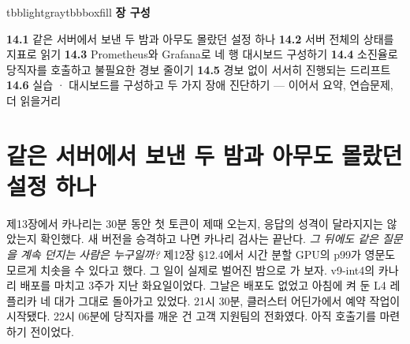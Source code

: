 \vspace{2.5pt}

\begin{calloutbox}{tbblightgray}{tbbboxfill}
{\normalsize\bfseries\color{tbbink}장 구성}\par\vspace{3pt}
\textbf{14.1} 같은 서버에서 보낸 두 밤과 아무도 몰랐던 설정 하나    \textbf{14.2} 서버 전체의 상태를 지표로 읽기    \textbf{14.3} Prometheus와 Grafana로 네 행 대시보드 구성하기    \textbf{14.4} 소진율로 당직자를 호출하고 불필요한 경보 줄이기    \textbf{14.5} 경보 없이 서서히 진행되는 드리프트    \textbf{14.6} 실습 · 대시보드를 구성하고 두 가지 장애 진단하기 — 이어서 요약, 연습문제, 더 읽을거리
\end{calloutbox}

\section{같은 서버에서 보낸 두 밤과 아무도 몰랐던 설정 하나}

제13장에서 카나리는 30분 동안 첫 토큰이 제때 오는지, 응답의 성격이 달라지지는 않았는지 확인했다. 새 버전을 승격하고 나면 카나리 검사는 끝난다. \textit{그 뒤에도 같은 질문을 계속 던지는 사람은 누구일까?} 제12장 §12.4에서 시간 분할 GPU의 p99가 영문도 모르게 치솟을 수 있다고 했다. 그 일이 실제로 벌어진 밤으로 가 보자. v9-int4의 카나리 배포를 마치고 3주가 지난 화요일이었다. 그날은 배포도 없었고 아침에 켜 둔 L4 레플리카 네 대가 그대로 돌아가고 있었다. 21시 30분, 클러스터 어딘가에서 예약 작업이 시작됐다. 22시 06분에 당직자를 깨운 건 고객 지원팀의 전화였다. 아직 호출기를 마련하기 전이었다.

